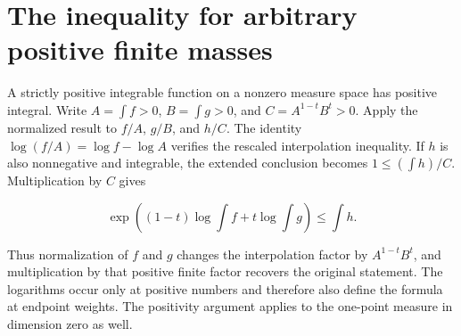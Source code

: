 \documentclass[11pt,a4paper]{article}
\begin{document}
\section{\texorpdfstring{The inequality for arbitrary positive finite masses}{The inequality for arbitrary positive finite masses}}


A strictly positive integrable function on a nonzero measure space has positive integral. Write \(A=\int f>0\), \(B=\int g>0\), and \(C=A^{1-t}B^t>0\). Apply the normalized result to \(f/A\), \(g/B\), and \(h/C\). The identity \(\log(f/A)=\log f-\log A\) verifies the rescaled interpolation inequality. If \(h\) is also nonnegative and integrable, the extended conclusion becomes \(1\le(\int h)/C\). Multiplication by \(C\) gives

\[\exp\!\left((1-t)\log\int f+t\log\int g\right)\le\int h.\]

Thus normalization of \(f\) and \(g\) changes the interpolation factor by \(A^{1-t}B^t\), and multiplication by that positive finite factor recovers the original statement. The logarithms occur only at positive numbers and therefore also define the formula at endpoint weights. The positivity argument applies to the one-point measure in dimension zero as well.
\end{document}
